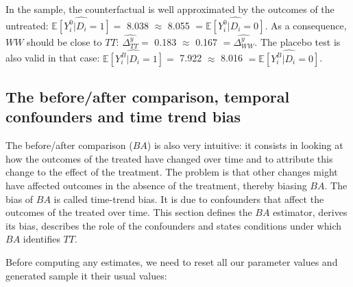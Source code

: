 \documentclass[]{book}
\newcommand{\esp}[1]{\mathbb{E}[ #1 ]}
\theoremstyle{definition}
\theoremstyle{definition}
\theoremstyle{definition}
\theoremstyle{remark}
\let\BeginKnitrBlock\begin \let\EndKnitrBlock\end
\begin{document}
In the sample, the counterfactual is well approximated by the outcomes
of the untreated: \(\hat{\esp{Y_i^0|D_i=1}}=\) 8.038 \(\approx\) 8.055
\(=\hat{\esp{Y_i^0|D_i=0}}\). As a consequence, \(WW\) should be close
to \(TT\): \(\hat{\Delta^y_{TT}}=\) 0.183 \(\approx\) 0.167
\(=\hat{\Delta^y_{WW}}\). The placebo test is also valid in that case:
\(\hat{\esp{Y_i^B|D_i=1}}=\) 7.922 \(\approx\) 8.016
\(=\hat{\esp{Y_i^B|D_i=0}}\).

\subsection{The before/after comparison, temporal confounders and time
trend
bias}\label{the-beforeafter-comparison-temporal-confounders-and-time-trend-bias}

The before/after comparison (\(BA\)) is also very intuitive: it consists
in looking at how the outcomes of the treated have changed over time and
to attribute this change to the effect of the treatment. The problem is
that other changes might have affected outcomes in the absence of the
treatment, thereby biasing \(BA\). The bias of \(BA\) is called
time-trend bias. It is due to confounders that affect the outcomes of
the treated over time. This section defines the \(BA\) estimator,
derives its bias, describes the role of the confounders and states
conditions under which \(BA\) identifies \(TT\).

\BeginKnitrBlock{example}
\protect\hypertarget{exm:unnamed-chunk-23}{}{\label{exm:unnamed-chunk-23}
}Before computing any estimates, we need to reset all our parameter
values and generated sample it their usual values:
\EndKnitrBlock{example}
\end{document}
